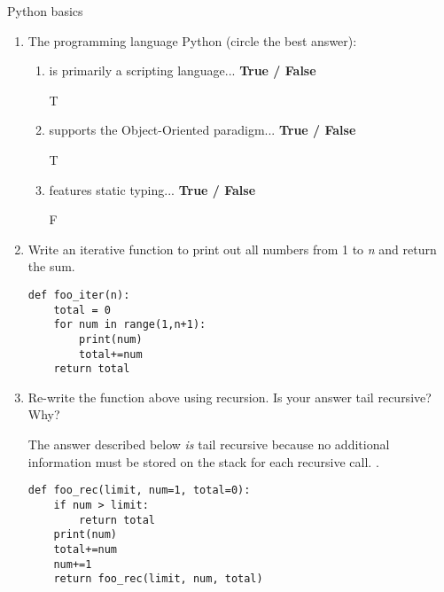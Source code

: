 Python basics
\begin{enumerate}

\item The programming language Python (circle the best answer):
	\begin{enumerate}
		\item is primarily a scripting language...
								\hspace{42mm}\textbf{True / False}
								\hspace{10mm}\begin{answer} T \end{answer}
		\item supports the Object-Oriented paradigm...
								\hspace{29mm}\textbf{True / False}
								\hspace{10mm}\begin{answer} T \end{answer}
		\item features static typing...
								\hspace{61mm}\textbf{True / False}
								\hspace{10mm}\begin{answer} F \end{answer}
	\end{enumerate}


\item Write an iterative function to print out all numbers from 1 to \emph{n} and return the sum.

\begin{answer}
\begin{lstlisting}
def foo_iter(n):
	total = 0
	for num in range(1,n+1):
		print(num)
		total+=num
	return total
\end{lstlisting}
\end{answer}

\item Re-write the function above using recursion. Is your answer tail recursive?  Why?

\begin{answer}
The answer described below \emph{is} tail recursive because no additional information must be stored on the stack for each recursive call.
.
\begin{lstlisting}
def foo_rec(limit, num=1, total=0):
	if num > limit:
		return total
	print(num)
	total+=num
	num+=1
	return foo_rec(limit, num, total)
\end{lstlisting}
\end{answer}


\end{enumerate}
